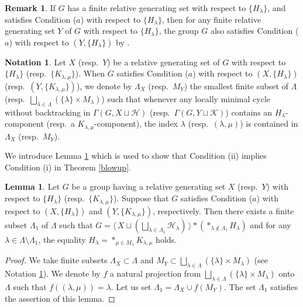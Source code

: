 \documentclass{amsart}
\theoremstyle{definition}
\newtheorem{Lem}[Thm]{Lemma}
\newtheorem{Rem}[Thm]{Remark}
\newtheorem{Not}[Thm]{Notation}
\begin{document}
\begin{Rem}
If $G$ has a finite relative generating set with respect to $\{H_\lambda\}$, and satisfies Condition ($a$) with respect to $\{H_\lambda\}$, then for any finite relative generating set $Y$ of $G$ with respect to $\{H_\lambda\}$, the group $G$ also satisfies Condition ($a$) with respect to $(Y,\{H_\lambda\})$ by \cite[Lemma 2.14]{M-O-Y1}. 
\end{Rem}

\begin{Not}\label{not*}
Let $X$ (resp.\ $Y$) be a relative generating set of $G$ with respect to $\{H_\lambda\}$ (resp.\ $\{K_{\lambda,\mu}\}$). 
When $G$ satisfies Condition ($a$) with respect to $(X,\{H_\lambda\})$ (resp.\ $(Y,\{K_{\lambda,\mu}\})$), we denote by $\Lambda_X$ (resp.\ $M_Y$) the smallest finite subset of $\Lambda$ (resp.\ $\bigsqcup_{\lambda\in\Lambda}(\{\lambda\}\times M_\lambda)$) such that whenever any locally minimal cycle without backtracking in $\Gamma(G,X\sqcup{\mathcal H})$ (resp.\ $\Gamma(G,Y\sqcup {\mathcal K})$) contains an $H_\lambda$-component (resp.\ a $K_{\lambda,\mu}$-component), the index $\lambda$ (resp.\ $(\lambda,\mu)$) is contained in $\Lambda_X$ (resp.\ $M_Y$). 
\end{Not}

We introduce Lemma \ref{a1} which is used to show that Condition (ii) implies Condition (i) in Theorem \ref{blowup}. 

\begin{Lem}\label{a1}
Let $G$ be a group having a relative generating set $X$ (resp.\ $Y$) with respect to $\{H_\lambda\}$ (resp.\ $\{K_{\lambda,\mu}\}$).  
Suppose that $G$ satisfies Condition ($a$) with respect to $(X,\{H_\lambda\})$ and $(Y,\{K_{\lambda,\mu}\})$, respectively. 
Then there exists a finite subset $\Lambda_1$ of $\Lambda$ such that $G=\langle\,X\sqcup \left(\bigsqcup_{\lambda\in\Lambda_1}{\mathcal H}_\lambda\right)\,\rangle \ast\left( \ast_{\lambda\notin\Lambda_1}H_\lambda\right)$ and for any $\lambda\in\Lambda\setminus\Lambda_1$, the equality $H_\lambda=\ast_{\mu\in M_\lambda}K_{\lambda,\mu}$ holds. 
\end{Lem}

\begin{proof}
We take finite subsets $\Lambda_X \subset \Lambda$ and $M_Y \subset \bigsqcup_{\lambda\in \Lambda}(\{\lambda\} \times M_\lambda)$ (see Notation \ref{not*}). 
We denote by $f$ a natural projection from $\bigsqcup_{\lambda\in \Lambda}(\{\lambda\} \times M_\lambda)$ onto $\Lambda$ such that $f((\lambda,\mu))=\lambda$. 
Let us set $\Lambda_1=\Lambda_X \cup f(M_Y)$. 
The set $\Lambda_1$ satisfies the assertion of this lemma. 
\end{proof}
\end{document}
